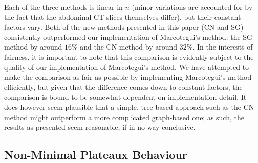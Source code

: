 \documentclass[preprint,a4paper]{elsarticle}
\begin{document}
Each of the three methods is linear in $n$ (minor variations are accounted for by the fact that the abdominal CT slices themselves differ), but their constant factors vary. Both of the new methods presented in this paper (CN and SG) consistently outperformed our implementation of Marcotegui's method: the SG method by around $16$\% and the CN method by around $32$\%. In the interests of fairness, it is important to note that this comparison is evidently subject to the quality of our implementation of Marcotegui's method. We have attempted to make the comparison as fair as possible by implementing Marcotegui's method efficiently, but given that the difference comes down to constant factors, the comparison is bound to be somewhat dependent on implementation detail. It does however seem plausible that a simple, tree-based approach such as the CN method might outperform a more complicated graph-based one; as such, the results as presented seem reasonable, if in no way conclusive.


\subsection{Non-Minimal Plateaux Behaviour}
\end{document}

